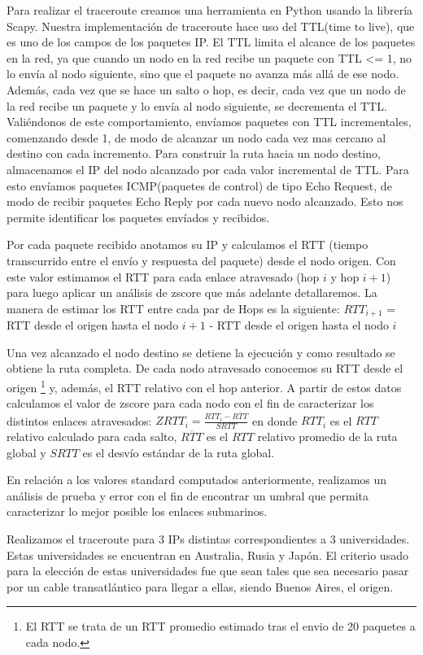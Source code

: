 Para realizar el traceroute creamos una herramienta en Python usando la librería Scapy. 
Nuestra implementación de traceroute hace uso del TTL(time to live), que es uno de los campos de los paquetes IP. El TTL limita el alcance de los paquetes en la red, ya que cuando un nodo en la red recibe un paquete con TTL <= 1, no lo envía al nodo siguiente, sino que el paquete no avanza más allá de ese nodo. Además, cada vez que se hace un salto o hop, es decir, cada vez que un nodo de la red recibe un paquete y lo envía al nodo siguiente, se decrementa el TTL. Valiéndonos de este comportamiento, envíamos paquetes con TTL incrementales, comenzando desde 1, de modo de alcanzar un nodo cada vez mas cercano al destino con cada incremento.
Para construir la ruta hacia un nodo destino, almacenamos el IP del nodo alcanzado por cada valor incremental de TTL. Para esto envíamos paquetes ICMP(paquetes de control) de tipo Echo Request, de modo de recibir paquetes Echo Reply por cada nuevo nodo alcanzado. Esto nos permite identificar los paquetes envíados y recibidos. 

Por cada paquete recibido anotamos su IP y calculamos el RTT (tiempo transcurrido entre el envío y respuesta del paquete) desde el nodo origen. Con este valor estimamos el RTT para cada enlace atravesado (hop $i$ y hop $i+1$) para luego aplicar un análisis de zscore que más adelante detallaremos. La manera de estimar los RTT entre cada par de Hops es la siguiente:
\newline
\newline
$RTT_{i+1}$ = RTT desde el origen hasta el nodo $i+1$ - RTT desde el origen hasta el nodo $i$
\newline

Una vez alcanzado el nodo destino se detiene la ejecución y como resultado se obtiene la ruta completa. De cada nodo atravesado conocemos su RTT desde el origen \footnote{El RTT se trata de un RTT promedio estimado tras el envio de 20 paquetes a cada nodo.} y, además, el RTT relativo con el hop anterior. A partir de estos datos calculamos el valor de zscore para cada nodo con el fin de caracterizar los distintos enlaces atravesados:
\newline
\newline
$ZRTT_i = \frac{RTT_i-\overline{RTT}}{SRTT}$
en donde $RTT_i$ es el $RTT$ relativo calculado para cada salto, $\overline{RTT}$ es el $RTT$ relativo promedio de la ruta global y $SRTT$ es el desvío estándar de la ruta global.
\newline

En relación a los valores standard computados anteriormente, realizamos un análisis de prueba y error con el fin de encontrar un umbral que permita caracterizar lo mejor posible los enlaces submarinos.

Realizamos el traceroute para 3 IPs distintas correspondientes a 3 universidades. Estas universidades se encuentran en Australia, Rusia y Japón. El criterio usado para la elección de estas universidades fue que sean tales que sea necesario pasar por un cable transatlántico para llegar a ellas, siendo Buenos Aires, el origen.